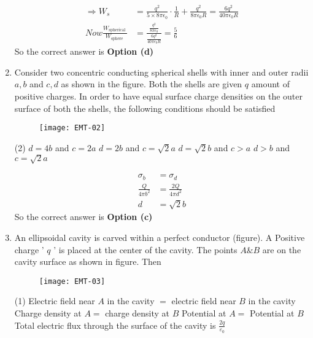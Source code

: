 \begin{enumerate}
\begin{answer}
$$\begin{aligned}
	\Rightarrow W_{s}&=\frac{q^{2}}{5 \times 8 \pi \epsilon_{0}} \cdot \frac{1}{R}+\frac{q^{2}}{8 \pi \epsilon_{0} R}=\frac{6 q^{2}}{40 \pi \epsilon_{0} R}\\
	Now
	\frac{W_{\text {spherical }}}{W_{\text {sphere }}}&=\frac{\frac{q^{2}}{8 \pi \epsilon_{0}}}{\frac{6 q^{2}}{40 \pi \epsilon_{0} R}}=\frac{5}{6}
\end{aligned}
$$
So the correct answer is \textbf{Option (d)}
\end{answer}
\item  Consider two concentric conducting spherical shells with inner and outer radii $a, b$ and $c, d$ as shown in the figure. Both the shells are given $q$ amount of positive charges. In order to have equal surface charge densities on the outer surface of both the shells, the following conditions should be satisfied	
\begin{figure}[H]
	\centering
	\texttt{[image: EMT-02]}
\end{figure}
 \begin{tasks}(2)
	\task[\textbf{a.}]$d=4 b$ and $c=2 a$
	\task[\textbf{b.}]$d=2 b$ and $c=\sqrt{2} a$
	\task[\textbf{c.}]$d=\sqrt{2} b$ and $c>a$
	\task[\textbf{d.}] $d>b$ and $c=\sqrt{2} a$
\end{tasks}	
\begin{answer}
	$$
	\begin{aligned}
	\sigma_{b}&=\sigma_{d} \\ \frac{Q}{4 \pi b^{2}}&=\frac{2 Q}{4 \pi d^{2}} \\ d&=\sqrt{2} b
\end{aligned}
$$
So the correct answer is \textbf{Option (c)}
\end{answer}
\item  An ellipsoidal cavity is carved within a perfect conductor (figure). A Positive charge ' $q$ ' is placed at the center of the cavity. The points $A \& B$ are on the cavity surface as shown in figure. Then
\begin{figure}[H]
	\centering
	\texttt{[image: EMT-03]}
\end{figure}	
 \begin{tasks}(1)
	\task[\textbf{a.}] Electric field near $A$ in the cavity $=$ electric field near $B$ in the cavity
	\task[\textbf{b.}]Charge density at $A=$ charge density at $B$
	\task[\textbf{c.}]Potential at $A=$ Potential at $B$
	\task[\textbf{d.}] Total electric flux through the surface of the cavity is $\frac{2 q}{\varepsilon_{0}}$	
\end{tasks}	

\end{enumerate}

